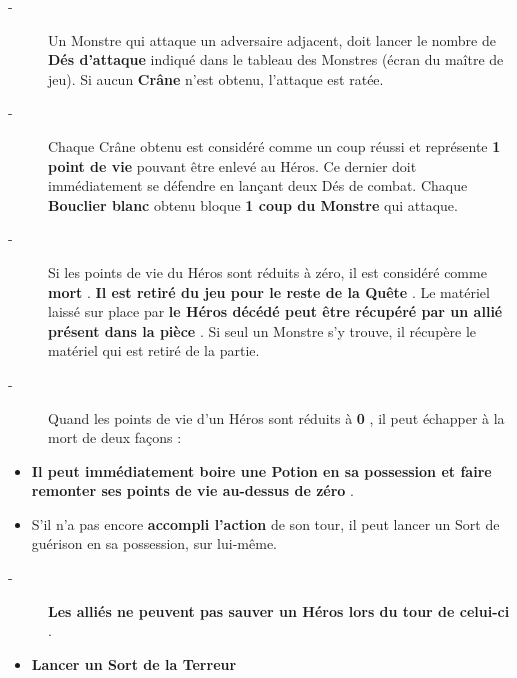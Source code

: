 \documentclass{scrartcl}%
\begin{document}
%
\begin{description}%
\item[{-} ]%
%
 Un Monstre qui attaque un adversaire adjacent, doit lancer le nombre de %
\textcolor{mygreen}{%
\textbf{Dés d'attaque}%
}%
\textit{ }%
 indiqué dans le tableau des Monstres (écran du maître de jeu). Si aucun %
\textcolor{mygreen}{%
\textbf{Crâne}%
}%
\textit{ }%
 n'est obtenu, l'attaque est ratée.
%
\item[{-} ]%
%
 Chaque Crâne obtenu est considéré comme un coup réussi et représente %
\textcolor{mygreen}{%
\textbf{1 point de vie}%
}%
\textit{ }%
 pouvant être enlevé au Héros. Ce dernier doit immédiatement se défendre en lançant deux Dés de combat. Chaque %
\textcolor{mygreen}{%
\textbf{Bouclier blanc}%
}%
\textit{ }%
 obtenu bloque %
\textcolor{mygreen}{%
\textbf{1 coup du Monstre}%
}%
\textit{ }%
 qui attaque.
%
\item[{-} ]%
%
 Si les points de vie du Héros sont réduits à zéro, il est considéré comme %
\textcolor{mygreen}{%
\textbf{mort}%
}%
. %
\textcolor{mygreen}{%
\textbf{Il est retiré du jeu pour le reste de la Quête}%
}%
. Le matériel laissé sur place par %
\textcolor{mygreen}{%
\textbf{le Héros décédé peut être récupéré par un allié présent dans la pièce}%
}%
. Si seul un Monstre s'y trouve, il récupère le matériel qui est retiré de la partie.
%
\item[{-} ]%
%
 Quand les points de vie d'un Héros sont réduits à %
\textcolor{mygreen}{%
\textbf{0}%
}%
, il peut échapper à la mort de deux façons :
%
\end{description}%
\begin{itemize}%
\item%
%
\textcolor{mygreen}{%
\textbf{Il peut immédiatement boire une Potion en sa possession et faire remonter ses points de vie au{-}dessus de zéro}%
}%
.
%
\item%
%
 S'il n'a pas encore %
\textcolor{mygreen}{%
\textbf{accompli l'action}%
}%
\textit{ }%
 de son tour, il peut lancer un Sort de guérison en sa possession, sur lui{-}même.
%
\end{itemize}%
\begin{description}%
\item[{-} ]%
%
\textcolor{mygreen}{%
\textbf{Les alliés ne peuvent pas sauver un Héros lors du tour de celui{-}ci}%
}%
.
%
\end{description}%
\begin{itemize}%
\item%
%
\textcolor{mygreen}{%
\textbf{Lancer un Sort de la Terreur}%
}%

%
\end{itemize}%
\end{document}
